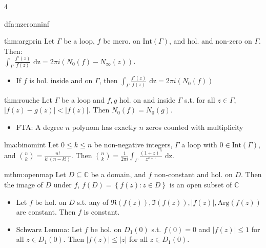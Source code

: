 \documentclass[landscape, 8pt]{extarticle}
\begin{document}
\begin{multicols*}{4}
\begin{dfn}{dfn:nzeronninf}{ }
			
		\end{dfn}
		
		
		\begin{thm}{thm:argprin}{ }
			Let $\Gamma$ be a loop, $f$ be mero. on $\text{Int}(\Gamma)$, and hol. and non-zero on $\Gamma$. Then:\\
			$\int_{\Gamma}\frac{f'(z)}{f(z)} \text{ dz} = 2 \pi i (N_0(f) - N_\infty(z))$.
			
			\begin{itemize}
				\item If $f$ is hol. inside and on $\Gamma$, then $\int_{\Gamma}\frac{f'(z)}{f(z)} \text{ dz} = 2 \pi i (N_0(f))$
			\end{itemize}
			
			
		\end{thm}
		
		
		\begin{thm}{thm:rouche}{ }
			Let $\Gamma$ be a loop and $f, g$ hol. on and inside $\Gamma$ s.t. for all $z \in \Gamma$, $\left|f(z) - g(z)\right| < \left|f(z)\right|.$ Then $N_0(f) = N_0(g)$.
			\begin{itemize}
				\item FTA: A degree $n$ polynom has exactly $n$ zeros counted with multiplicity
			\end{itemize}
			
			
		\end{thm}
		
		
		\begin{lma}{lma:binomint}{ }
			Let $0 \le k \le n$ be non-negative integers, $\Gamma$ a loop with $0 \in \text{Int}(\Gamma)$, and $\binom{n}{k} = \frac{n!}{k!(n-k!)}$. Then $\binom{n}{k} = \frac{1}{2 \pi i} \int_{\Gamma} \frac{(1+z)^n}{z^{k+1}} \text{ dz}$.
			
		\end{lma}
		
		
		\begin{mthm}{mthm:openmap}{ }
			Let $D \subseteq \mathbb{C}$ be a domain, and $f$ non-constant and hol. on $D$. Then the image of $D$ under $f$, $f(D) = \left\{f(z) : z\in D\right\}$ is an open subset of $\mathbb{C}$
			
			\begin{itemize}
				\item Let $f$ be hol. on $D$ s.t. any of $\Re(f(z)), \Im(f(z)), \left|f(z)\right|, \text{Arg}(f(z))$ are constant. Then $f$ is constant.
				\item Schwarz Lemma: Let $f$ be hol. on $D_1(0)$ s.t. $f(0) = 0$ and $\left|f(z)\right| \le 1$ for all $z \in D_1(0)$. Then $\left|f(z)\right| \le \left|z\right|$ for all $z \in D_1(0)$.
			\end{itemize}
			

\end{mthm}
\end{multicols*}
\end{document}
